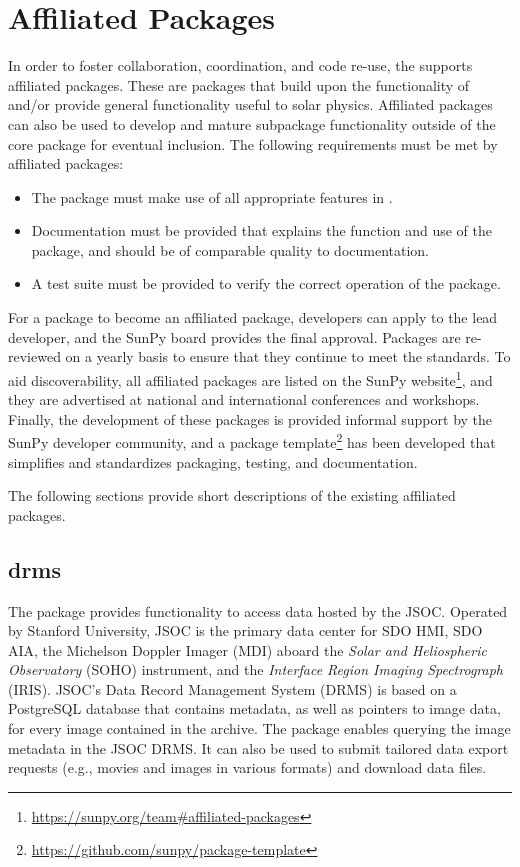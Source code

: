 \section{Affiliated Packages}
\label{sec:affil_package}

In order to foster collaboration, coordination, and code re-use, the \sunpyproj supports affiliated packages.
These are \python packages that build upon the functionality of \sunpypkg and/or provide general functionality useful to solar physics.
Affiliated packages can also be used to develop and mature subpackage functionality outside of the \sunpypkg core package for eventual inclusion.
The following requirements must be met by affiliated packages:
\begin{itemize}
    \item The package must make use of all appropriate features in \sunpypkg.
    \item Documentation must be provided that explains the function and use of the package, and should be of comparable quality to \sunpypkg documentation.
    \item A test suite must be provided to verify the correct operation of the package.
\end{itemize}
For a package to become an affiliated package, developers can apply to the lead developer, and the SunPy board provides the final approval.
Packages are re-reviewed on a yearly basis to ensure that they continue to meet the standards.
To aid discoverability, all affiliated packages are listed on the SunPy website\footnote{\url{https://sunpy.org/team\#affiliated-packages}}, and they are advertised at national and international conferences and workshops.
Finally, the development of these packages is provided informal support by the SunPy developer community, and
a package template\footnote{\url{https://github.com/sunpy/package-template}} has been developed that simplifies and standardizes packaging, testing, and documentation.

The following sections provide short descriptions of the existing affiliated packages.

\subsection{drms}
\label{sec:drms}

The  package provides functionality to access data hosted by the JSOC.
Operated by Stanford University, JSOC is the primary data center for SDO HMI, SDO AIA, the Michelson Doppler Imager (MDI) aboard the \textit{Solar and Heliospheric Observatory} (SOHO) instrument, and the \textit{Interface Region Imaging Spectrograph} (IRIS).
JSOC's Data Record Management System (DRMS) is based on a PostgreSQL database that contains metadata, as well as pointers to image data, for every image contained in the archive.
The  package enables querying the image metadata in the JSOC DRMS.
It can also be used to submit tailored data export requests (e.g., movies and images in various formats) and download data files.

